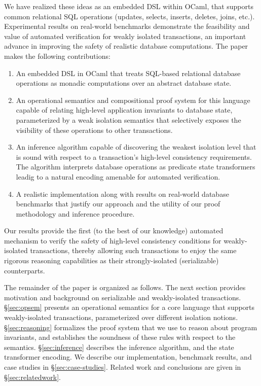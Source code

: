 We have realized these ideas as an embedded DSL within OCaml, that
supports common relational SQL operations (updates, selects, inserts,
deletes, joins, etc.).  Experimental results on real-world benchmarks
demonstrate the feasibility and value of automated verification for
weakly isolated transactions, an important advance in improving the
safety of realistic database computations. The paper makes the
following contributions:
\vspace*{-6pt}
\begin{enumerate}
\item An embedded DSL in OCaml that treats SQL-based relational
  database operations as monadic computations over an abstract
  database state.
 \item An operational semantics and compositional proof system for
   this language capable of relating high-level application invariants
   to database state, parameterized by a weak isolation semantics that
   selectively exposes the visibility of these operations to other
   transactions.
 \item An inference algorithm capable of discovering the weakest
   isolation level that is sound with respect to a transaction's
   high-level consistency requirements.  The algorithm interprets
   database operations as predicate state transformers leadig to a
   natural encoding amenable for automated verification.
 \item A realistic implementation along with results on real-world
   database benchmarks that justify our approach and the utility of
   our proof methodology and inference procedure.
\end{enumerate}
\noindent Our results provide the first (to the best of our knowledge)
automated mechanism to verify the safety of high-level consistency
conditions for weakly-isolated transactions, thereby allowing such
transactions to enjoy the same rigorous reasoning capabilities as
their strongly-isolated (serializable) counterparts.

The remainder of the paper is organized as follows. The next section
provides motivation and background on serializable and weakly-isolated
transactions. \S\ref{sec:opsem} presents an operational semantics for
a core language that supports weakly-isolated transactions,
parameterized over different isolation notions. \S\ref{sec:reasoning}
formalizes the proof system that we use to reason about program
invariants, and establishes the soundness of these rules with respect
to the semantics. \S\ref{sec:inference} describes the inference
algorithm, and the state transformer encoding.  We describe our
implementation, benchmark results, and case studies in
\S\ref{sec:case-studies}.  Related work and conclusions are given in
\S\ref{sec:relatedwork}.
